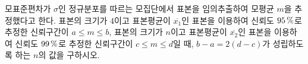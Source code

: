 모표준편차가 $\sigma$인 정규분포를 따르는 모집단에서 표본을 임의추출하여 모평균 $m$을 추정했다고 한다. 표본의 크기가 $4$이고 표본평균이 $\overline{x_1}$인 표본을 이용하여 신뢰도 $95\mkern3mu \%$로 추정한 신뢰구간이 $a\le m\le b$, 표본의 크기가 $n$이고 표본평균이 $\overline{x_2}$인 표본을 이용하여 신뢰도 $99\mkern3mu \%$로 추정한 신뢰구간이 $c\le m\le d$일 때, $b-a=2(d-c)$가 성립하도록 하는 $n$의 값을 구하시오. 
